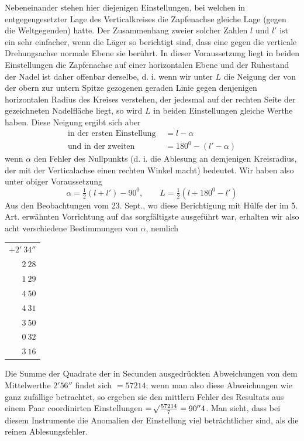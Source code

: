 Nebeneinander stehen hier diejenigen Einstellungen, bei welchen in entgegengesetzter Lage des Verticalkreises die Zapfenachse gleiche Lage (gegen die Weltgegenden) hatte. Der Zusammenhang zweier solcher Zahlen $l$ und $l'$ ist ein sehr einfacher, wenn die Läger so berichtigt sind, dass eine gegen die verticale Drehungsachse normale Ebene sie berührt. In dieser Voraussetzung liegt in beiden Einstellungen die Zapfenachse auf einer horizontalen Ebene und der Ruhestand der Nadel ist daher offenbar derselbe, d. i. wenn wir unter $L$ die Neigung der von der obern zur untern Spitze gezogenen geraden Linie gegen denjenigen horizontalen Radius des Kreises verstehen, der jedesmal auf der rechten Seite der gezeichneten Nadelfläche liegt, so wird $L$ in beiden Einstellungen gleiche Werthe haben. Diese Neigung ergibt sich aber
\[
\begin{aligned}
\text{in der ersten Einstellung }&=l-\alpha\\
\text{und in der zweiten }&=180^0-(l'-\alpha)
\end{aligned}
\]
wenn $\alpha$ den Fehler des Nullpunkts (d. i. die Ablesung an demjenigen Kreisradius, der mit der Verticalachse einen rechten Winkel macht) bedeutet. Wir haben also unter obiger Voraussetzung
\[
\alpha=\tfrac{1}{2}(l+l')-90^0,\qquad L=\tfrac{1}{2}(l+180^0-l')
\]
Aus den Beobachtungen vom 23. Sept., wo diese Berichtigung mit Hülfe der im 5. Art. erwähnten Vorrichtung auf das sorgfältigste ausgeführt war, erhalten wir also acht verschiedene Bestimmungen von $\alpha$, nemlich
\begin{center}
\begin{tabular}{r}
$+2'\ 34''$\\
$2\ 28$\\
$1\ 29$\\
$4\ 50$\\
$4\ 31$\\
$3\ 50$\\
$0\ 32$\\
$3\ 16$
\end{tabular}
\end{center}

Die Summe der Quadrate der in Secunden ausgedrückten Abweichungen von dem Mittelwerthe $2'56''$ findet sich $=57214$; wenn man also diese Abweichungen wie ganz zufällige betrachtet, so ergeben sie den mittlern Fehler des
Resultats aus einem Paar coordinirten Einstellungen $=\mathord{{}^{}\!\surd}\frac{57214}{7}=90''4$. Man sieht, dass bei diesem Instrumente die Anomalien der Einstellung viel beträchtlicher sind, als die reinen Ablesungsfehler.

